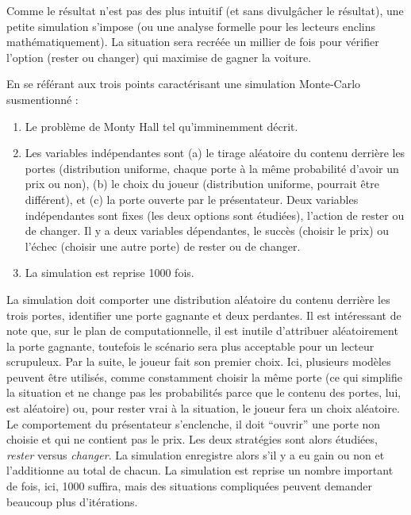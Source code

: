 \documentclass[
]{book}
\begin{document}
Comme le résultat n'est pas des plus intuitif (et sans divulgâcher le résultat), une petite simulation s'impose (ou une analyse formelle pour les lecteurs enclins mathématiquement). La situation sera recréée un millier de fois pour vérifier l'option (rester ou changer) qui maximise de gagner la voiture.

En se référant aux trois points caractérisant une simulation Monte-Carlo susmentionné :

\begin{enumerate}
\def\labelenumi{\arabic{enumi}.}
\item
  Le problème de Monty Hall tel qu'imminemment décrit.
\item
  Les variables indépendantes sont (a) le tirage aléatoire du contenu derrière les portes (distribution uniforme, chaque porte à la même probabilité d'avoir un prix ou non), (b) le choix du joueur (distribution uniforme, pourrait être différent), et (c) la porte ouverte par le présentateur. Deux variables indépendantes sont fixes (les deux options sont étudiées), l'action de rester ou de changer. Il y a deux variables dépendantes, le succès (choisir le prix) ou l'échec (choisir une autre porte) de rester ou de changer.
\item
  La simulation est reprise 1000 fois.
\end{enumerate}

La simulation doit comporter une distribution aléatoire du contenu derrière les trois portes, identifier une porte gagnante et deux perdantes. Il est intéressant de note que, sur le plan de computationnelle, il est inutile d'attribuer aléatoirement la porte gagnante, toutefois le scénario sera plus acceptable pour un lecteur scrupuleux. Par la suite, le joueur fait son premier choix. Ici, plusieurs modèles peuvent être utilisés, comme constamment choisir la même porte (ce qui simplifie la situation et ne change pas les probabilités parce que le contenu des portes, lui, est aléatoire) ou, pour rester vrai à la situation, le joueur fera un choix aléatoire. Le comportement du présentateur s'enclenche, il doit ``ouvrir'' une porte non choisie et qui ne contient pas le prix. Les deux stratégies sont alors étudiées, \emph{rester} versus \emph{changer}. La simulation enregistre alors s'il y a eu gain ou non et l'additionne au total de chacun. La simulation est reprise un nombre important de fois, ici, 1000 suffira, mais des situations compliquées peuvent demander beaucoup plus d'itérations.
\end{document}
